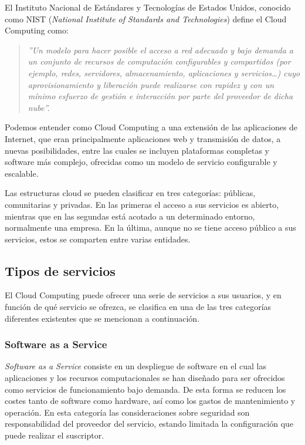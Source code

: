 El Instituto Nacional de Estándares y Tecnologías de Estados Unidos, conocido como NIST (\textit{National Institute of Standards and Technologies}) define el Cloud Computing como:

\begin{quotation}
\textit{''Un modelo para hacer posible el acceso a red adecuado y bajo demanda a un conjunto de recursos de computación configurables y compartidos (por ejemplo, redes, servidores, almacenamiento, aplicaciones y servicios…) cuyo aprovisionamiento y liberación puede realizarse con rapidez y con un mínimo esfuerzo de gestión e interacción por parte del proveedor de dicha nube''.} \cite{inteco-cloud}
\end{quotation}

Podemos entender como Cloud Computing a una extensión de las aplicaciones de Internet, que eran principalmente aplicaciones web y transmisión de datos, a nuevas posibilidades, entre las cuales se incluyen plataformas completas y software más complejo, ofrecidas como un modelo de servicio configurable y escalable.

Las estructuras cloud se pueden clasificar en tres categorías: públicas, comunitarias y privadas. En las primeras el acceso a sus servicios es abierto, mientras que en las segundas está acotado a un determinado entorno, normalmente una empresa. En la última, aunque no se tiene acceso público a sus servicios, estos se comparten entre varias entidades.

\subsection{Tipos de servicios}

El Cloud Computing puede ofrecer una serie de servicios a sus usuarios, y en función de qué servicio se ofrezca, se clasifica en una de las tres categorías diferentes existentes que se mencionan a continuación.

\subsubsection{Software as a Service}

\emph{Software as a Service} consiste en un despliegue de software en el cual las aplicaciones y los recursos computacionales se han diseñado para ser ofrecidos como servicios de funcionamiento bajo demanda. De esta forma se reducen los costes tanto de software como hardware, así como los gastos de mantenimiento y operación. En esta categoría las consideraciones sobre seguridad son responsabilidad del proveedor del servicio, estando limitada la configuración que puede realizar el suscriptor.

